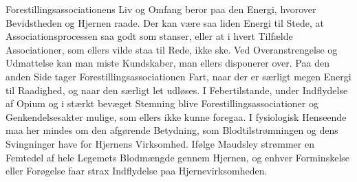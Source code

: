 \documentclass[12pt,a4paper,openany]{book}
\begin{document}
Forestillingsassociationens Liv og Omfang beror paa den Energi, hvorover
Bevidstheden og Hjernen raade. Der kan være saa liden Energi til Stede, at
Associationsprocessen saa godt som stanser, eller at i hvert Tilfælde
Associationer, som ellers vilde staa til Rede, ikke ske. Ved Overanstrengelse
og Udmattelse kan man miste Kundskaber, man ellers disponerer over. Paa den
anden Side tager Forestillingsassociationen Fart, naar der er særligt megen
Energi til Raadighed, og naar den særligt let udløses. I Febertilstande, under
Indflydelse af Opium og i stærkt bevæget Stemning blive
Forestillingsassociationer og Genkendelsesakter mulige, som ellers ikke kunne
foregaa. I fysiologisk Henseende maa her mindes om den afgørende Betydning, som
Blodtilstrømningen og dens Svingninger have for Hjernens Virksomhed. Ifølge
Maudsley strømmer en Femtedel af hele Legemets Blodmængde gennem Hjernen, og
enhver Forminskelse eller Forøgelse faar strax Indflydelse paa Hjernevirksomheden.
\end{document}
